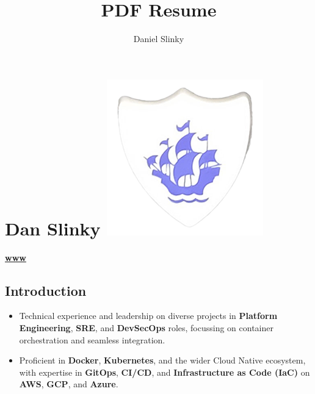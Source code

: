 \documentclass[
]{article}
\author{}
\date{}
\title{PDF Resume}
\author{Daniel Slinky}
\date{}
\providecommand{\tightlist}{%
  \setlength{\itemsep}{0pt}\setlength{\parskip}{0pt}}
\begin{document}

\hypertarget{simple-markdown-dan-slinky}{%
\section[\faMarkdown Dan Slinky ]{\texorpdfstring{\faMarkdown Dan Slinky
\protect\includegraphics{../../favicon.png}}{ Dan Slinky }}\label{simple-markdown-dan-slinky}}

\href{https://rtfm.danslinky.co.uk/resumes}{\textbf{www}}
\href{https://linkedin.com/in/danslinky}{\faLinkedin}
\href{https://github.com/danslinky}{\faGithub}
\href{mailto:sysadmin@danslinky.co.uk}{\faEnvelope}

\hypertarget{fontawesome-solid-terminal-introduction}{%
\subsection{\texorpdfstring{\faTerminal
Introduction}{ Introduction}}\label{fontawesome-solid-terminal-introduction}}

\begin{itemize}
\tightlist
\item
  Technical experience and leadership on diverse projects in
  \textbf{Platform Engineering}, \textbf{SRE}, and \textbf{DevSecOps}
  roles, focussing on container orchestration and seamless integration.
\item
  Proficient in \faDocker \textbf{Docker}, \faDharmachakra
  \textbf{Kubernetes}, and the wider Cloud Native ecosystem, with
  expertise in \textbf{GitOps}, \textbf{CI/CD}, and
  \textbf{Infrastructure as Code (IaC)} on \textbf{AWS}, \textbf{GCP},
  and \textbf{Azure}.
\end{itemize}
\end{document}
